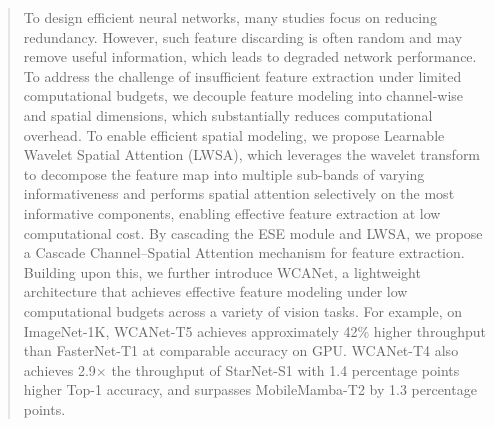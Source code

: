 \documentclass[a4paper,fleqn]{cas-dc}
\begin{document}
\begin{abstract}
To design efficient neural networks, many studies focus on reducing redundancy. However, such feature discarding is often random and may remove useful information, which leads to degraded network performance. To address the challenge of insufficient feature extraction under limited computational budgets, we decouple feature modeling into channel-wise and spatial dimensions, which substantially reduces computational overhead. To enable efficient spatial modeling, we propose Learnable Wavelet Spatial Attention (LWSA), which leverages the wavelet transform to decompose the feature map into multiple {\color{blue}sub-bands} of varying informativeness and performs spatial attention selectively on the most informative components, enabling effective feature extraction at low computational cost. By cascading the ESE module and LWSA, we propose a Cascade Channel--Spatial Attention mechanism for feature extraction. Building upon this, we further introduce WCANet, a lightweight architecture that achieves effective feature modeling under low computational budgets across a variety of vision tasks. For example, on ImageNet-1K, WCANet-T5 achieves approximately 42\% higher throughput than FasterNet-T1 at comparable accuracy on GPU. WCANet-T4 also achieves 2.9$\times$ the throughput of StarNet-S1 with 1.4 percentage points higher Top-1 accuracy, and surpasses MobileMamba-T2 by 1.3 percentage points.
\end{abstract}

\end{document}
